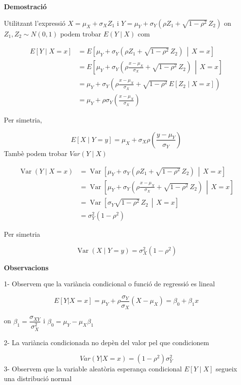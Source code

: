 \documentclass[
  catalan,
]{article}
\theoremstyle{definition}
\theoremstyle{definition}
\theoremstyle{definition}
\theoremstyle{definition}
\theoremstyle{remark}
\begin{document}
\textbf{Demostració}

Utilitzant l'expressió \(X=\mu_X+\sigma_X Z_1\) i \(Y=\mu_Y+\sigma_Y\left(\rho Z_1+\sqrt{1-\rho^2}\,Z_2\right)\) on \(Z_1,Z_2\sim N(0,1)\) podem trobar \(E(Y\mid X)\) com

\[
\begin{aligned}
E[Y \mid X = x]
&= E\left[\mu_Y + \sigma_Y\left(\rho Z_1 + \sqrt{1-\rho^2}\,Z_2\right)\,\middle|\, X=x\right] \\
&= E\left[\mu_Y + \sigma_Y\left(\rho \frac{x-\mu_X}{\sigma_X}+ \sqrt{1-\rho^2}\,Z_2\right)\,\middle|\, X=x\right] \\
&= \mu_Y+ \sigma_Y\left(\rho \frac{x-\mu_X}{\sigma_X}+ \sqrt{1-\rho^2}\,E[Z_2 \mid X=x]\right) \\
&= \mu_Y+\rho \sigma_Y \left(\frac{x-\mu_X}{\sigma_X}
\right)
\end{aligned}
\]

Per simetria,

\[
E[X \mid Y = y]=\mu_X+\sigma_X \rho\left(\frac{y-\mu_Y}{\sigma_Y}\right)
\]
Tambè podem trobar \(Var(Y \mid X)\)

\[
\begin{aligned}
\operatorname{Var}(Y\mid X=x)&= \operatorname{Var}\left[\mu_Y+\sigma_Y\left(\rho Z_1+\sqrt{1-\rho^2}\,Z_2\right)\,\middle|\, X=x\right] \\
&= \operatorname{Var}\left[\mu_Y+\sigma_Y\left(\rho\frac{x-\mu_X}{\sigma_X}+\sqrt{1-\rho^2}\,Z_2\right)\,\middle|\, X=x\right] \\
&= \operatorname{Var}\left[\sigma_Y\sqrt{1-\rho^2}\,Z_2\,\middle|\, X=x\right] \\&= \sigma_Y^2(1-\rho^2)
\end{aligned}
\]

Per simetria

\[
\operatorname{Var}(X\mid Y=y)=\sigma_X^2(1-\rho^2)
\]

\textbf{Observacions}

1- Observem que la variància condicional o funció de regressió es lineal

\[
 E[Y|X=x]= \mu_Y+\rho  \frac {\sigma_Y} {\sigma_X} (X-\mu_X)  =\beta_0 +\beta_1 x
\]

on \(\beta_1= \dfrac {\sigma_{XY}}{\sigma_X^2}\) i \(\beta_0=\mu_Y-\mu_X \beta_1\)

2- La variància condicionada no depèn del valor pel que condicionem

\[
Var(Y|X=x)=(1-\rho^2) \sigma_Y^2    
\]
3- Observem que la variable aleatòria esperança condicional \(E[Y\mid X]\) segueix una distribució normal
\end{document}
